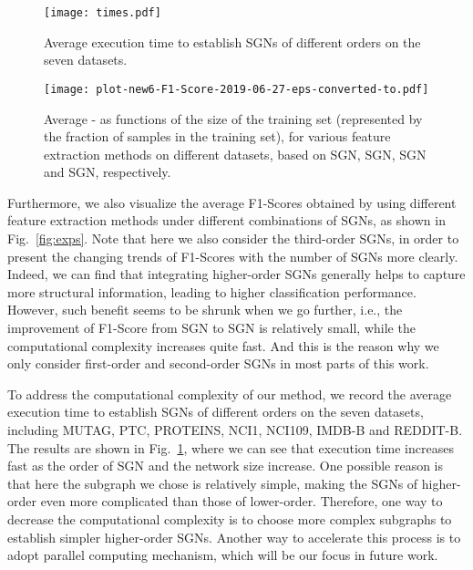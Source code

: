 \documentclass[10pt,journal,compsoc]{IEEEtran}
\begin{document}
\begin{figure}[!t]
  \centering
  \texttt{[image: times.pdf]}
  \caption{Average execution time to establish SGNs of different orders on the seven datasets.}
  \label{fig:time}
\end{figure}

\begin{figure*}[!t]
	\centering
	\texttt{[image: plot-new6-F1-Score-2019-06-27-eps-converted-to.pdf]}
	\caption{Average - as functions of the size of the training set (represented by the fraction of samples in the training set), for various feature extraction methods on different datasets, based on SGN, SGN, SGN and SGN, respectively.}
	\label{fig:precision}
\end{figure*}

Furthermore, we also visualize the average F1-Scores obtained by using different feature extraction methods under different combinations of SGNs, as shown in Fig.~\ref{fig:exps}. Note that here we also consider the third-order SGNs, in order to present the changing trends of F1-Scores with the number of SGNs more clearly. Indeed, we can find that integrating higher-order SGNs generally helps to capture more structural information, leading to higher classification performance. However, such benefit seems to be shrunk when we go further, i.e., the improvement of F1-Score from SGN to SGN is relatively small, while the computational complexity increases quite fast. And this is the reason why we only consider first-order and second-order SGNs in most parts of this work.

To address the computational complexity of our method, we record the average execution time to establish SGNs of different orders on the seven datasets, including MUTAG, PTC, PROTEINS, NCI1, NCI109, IMDB-B and REDDIT-B. The results are shown in Fig.~\ref{fig:time}, where we can see that execution time increases fast as the order of SGN and the network size increase. One possible reason is that here the subgraph we chose is relatively simple, making the SGNs of higher-order even more complicated than those of lower-order. Therefore, one way to decrease the computational complexity is to choose more complex subgraphs to establish simpler higher-order SGNs. Another way to accelerate this process is to adopt parallel computing mechanism, which will be our focus in future work.
\end{document}
